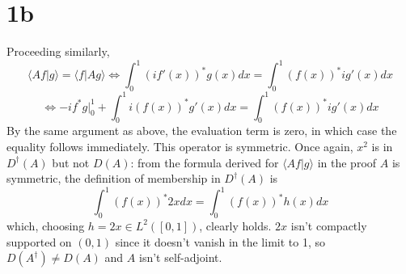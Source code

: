 \message{ !name(hw1.tex)}\documentclass{article}
\begin{document}
\section*{1b}
Proceeding similarly,
\[
  \langle Af|g \rangle=\langle f|Ag \rangle
  \Leftrightarrow \int_{0}^{1}(if'(x))^{*}g(x)dx=\int_{0}^{1}(f(x))^{*}ig'(x)dx
\]
\[
  \Leftrightarrow -if^{*}g\bigg|_{0}^{1}+\int_{0}^{1}i(f(x))^{*}g'(x)dx=\int_{0}^{1}(f(x))^{*}ig'(x)dx
\]
By the same argument as above, the evaluation term is zero, in which case the equality follows immediately.
This operator is symmetric.
Once again, $x^{2}$ is in $D^{\dagger}(A)$ but not $D(A)$: from the formula derived for $\langle Af|g \rangle$ in the proof $A$ is symmetric,
the definition of membership in $D^{\dagger}(A)$ is
\[\int_{0}^{1}(f(x))^{*}2xdx=\int_{0}^{1}(f(x))^{*}h(x)dx\]
which, choosing $h=2x\in L^{2}([0,1])$, clearly holds.
$2x$ isn't compactly supported on $(0,1)$ since it doesn't vanish in the limit to 1, so $D(A^{\dagger})\neq D(A)$ and $A$ isn't self-adjoint.
\end{document}
